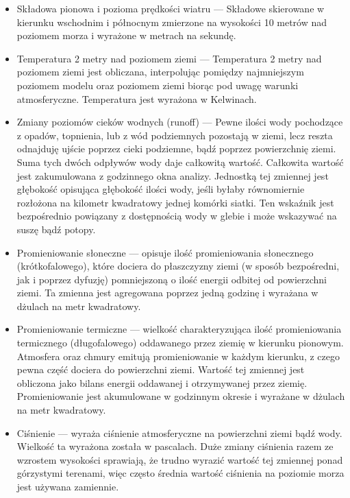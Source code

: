 \begin{itemize}
    \item Składowa pionowa i pozioma prędkości wiatru — 
    Składowe skierowane w kierunku wschodnim i północnym zmierzone na wysokości 10 metrów nad poziomem
    morza i wyrażone w metrach na sekundę.

    \item Temperatura 2 metry nad poziomem ziemi — Temperatura 2 metry nad poziomem ziemi jest
    obliczana, interpolując pomiędzy najmniejszym poziomem modelu oraz poziomem ziemi biorąc pod
    uwagę warunki atmosferyczne. Temperatura jest wyrażona w Kelwinach.

    \item Zmiany poziomów cieków wodnych (runoff) — 
    Pewne ilości wody pochodzące z opadów, topnienia, lub z wód podziemnych pozostają w ziemi, lecz reszta
    odnajduję ujście poprzez cieki podziemne, bądź poprzez powierzchnię ziemi. Suma tych dwóch
    odpływów wody daje całkowitą wartość. Całkowita wartość jest zakumulowana z godzinnego
    okna analizy. Jednostką tej zmiennej jest głębokość opisująca głębokość ilości wody, jeśli byłaby
    równomiernie rozłożona na kilometr kwadratowy jednej komórki siatki. Ten wskaźnik jest
    bezpośrednio powiązany z dostępnością wody w glebie i może wskazywać na suszę bądź potopy.

    \item Promieniowanie słoneczne — opisuje ilość promieniowania słonecznego (krótkofalowego), które dociera do 
    płaszczyzny ziemi (w sposób bezpośredni, jak i poprzez dyfuzję) pomniejszoną o ilość energii
    odbitej od powierzchni ziemi. Ta zmienna jest agregowana poprzez jedną godzinę i wyrażana w 
    dżulach na metr kwadratowy.

    \item Promieniowanie termiczne — wielkość charakteryzująca ilość promieniowania termicznego
    (długofalowego) oddawanego przez ziemię w kierunku pionowym. Atmosfera oraz chmury emitują 
    promieniowanie w każdym kierunku, z czego pewna część dociera do powierzchni ziemi. Wartość
    tej zmiennej jest obliczona jako bilans energii oddawanej i otrzymywanej przez ziemię. 
    Promieniowanie jest akumulowane w godzinnym okresie i wyrażane w dżulach na metr kwadratowy.

    \item Ciśnienie — wyraża ciśnienie atmosferyczne na powierzchni ziemi bądź wody. Wielkość
    ta wyrażona została w pascalach. Duże zmiany ciśnienia razem ze wzrostem wysokości sprawiają,
    że trudno wyrazić wartość tej zmiennej ponad górzystymi terenami, więc często średnia wartość
    ciśnienia na poziomie morza jest używana zamiennie.


\end{itemize}
